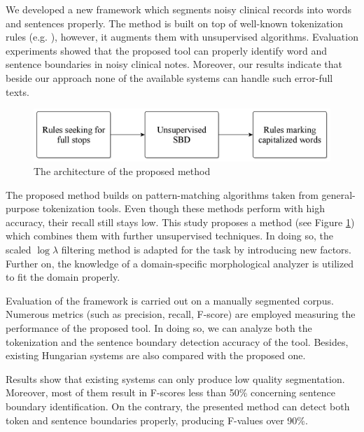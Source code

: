 \begin{core}
\begin{thesis}%
\label{thes:clin-segment}
We developed a new framework which segments noisy clinical records into words and sentences properly.
The method is built on top of well-known tokenization rules (e.g. \cite{Halacsy2004}), however, it augments them with unsupervised algorithms.
Evaluation experiments showed that the proposed tool can properly identify word and sentence boundaries in noisy clinical notes. 
Moreover, our results indicate that beside our approach none of the available systems can handle such error-full texts.
\end{thesis}

\begin{pub}
\cite{Orosz2013d, Orosz2014a}
\end{pub}
\end{core}

\begin{figure}[H]
  \centering
  \includegraphics[scale=0.2]{Clinical/clin_segm_arch.png} 
  \caption{The architecture of the proposed method}
  \label{fig:clin-segment-arch_en}
\end{figure}

The proposed method builds on pattern-matching algorithms taken from general-purpose tokenization tools.
Even though these methods perform with high accuracy, their recall still stays low.
This study proposes a method (see Figure \ref{fig:clin-segment-arch_en}) which combines them with further unsupervised techniques.
In doing so, the scaled $\log\lambda$ filtering method \cite{kiss2006unsupervised} is adapted for the task by introducing new  factors.
Further on, the knowledge of a domain-specific morphological analyzer is utilized to fit the domain properly.

Evaluation of the framework is carried out on a manually segmented corpus. 
Numerous metrics (such as precision, recall, F-score) are employed measuring the performance of the proposed tool.
In doing so, we can analyze both the tokenization and the sentence boundary detection accuracy of the tool.
Besides, existing Hungarian systems are also compared with the proposed one.

Results show that existing systems can only produce low quality segmentation.
Moreover, most of them result in F-scores less than 50\% concerning sentence boundary identification.
On the contrary, the presented method can detect both token and sentence boundaries properly, producing F-values over 90\%.


